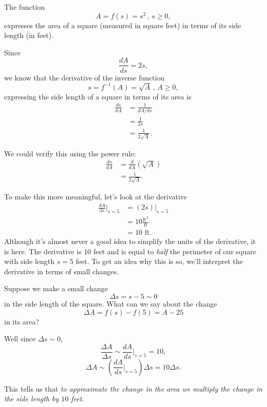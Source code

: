 \documentclass{ximera}
\begin{document}
\begin{example}  \label{ExLDKr3eDFRER}

The function
\[
         A = f(s) = s^2\, , \, s\geq 0 ,
\]
expresses the area of a square (measured in square feet) in terms of its side length (in feet).

Since
\[
   \frac{dA}{ds} = 2s ,
\]
we know that the derivative of the inverse function
\[
    s = f^{-1}(A)  = \sqrt{A}\, , \, A\geq 0,
\]
expressing the side length of a square in terms of its area is
\begin{align*}
 \frac{ds}{dA} &= \frac{1}{dA/ds} \\   
                      &= \frac{1}{2s} \\
                      &= \frac{1}{2\sqrt{A}} .
\end{align*}

We could verify this using the power rule:
\begin{align*}
 \frac{ds}{dA} &= \frac{d}{dA} \left( \sqrt{A} \right) \\   
                        &= \frac{1}{2\sqrt{A}} .
\end{align*}

To make this more meaningful, let's look at the derivative 
\begin{align*}
     \frac{dA}{ds}\Big|_{s=5} &= (2s)\Big|_{s=5} \\
                                           &= 10 \frac{\text{ft}^2}{\text{ft}} \\
                                           &= 10 \text{ ft}.
\end{align*}
Although it's almost never a good idea to simplify the units of the derivative, it is here. The derivative is $10$ feet and is equal to \emph{half} the perimeter of our square with side length $s=5$ feet. To get an idea why this is so, we'll interpret the derivative in terms of small changes.

Suppose we make a small change
\[
  \Delta s = s - 5 \sim 0 
\]
in the side length of the square. What can we say about the change 
\[
 \Delta A = f(s) - f(5) = A-25
\] 
in its area?
 
Well since $\Delta s \sim 0$,
\[
      \frac{\Delta A}{\Delta s} \sim   \frac{dA}{ds}\Big|_{s=5} = 10,
\]
\[
     \Delta A \sim  \left( \frac{dA}{ds}\Big|_{s=5}\right)\Delta s = 10 \Delta s .
\]

This tells us that \emph{to approximate the change in the area we multiply the change in the side length by $10$ feet}.


\end{example}
\end{document}
